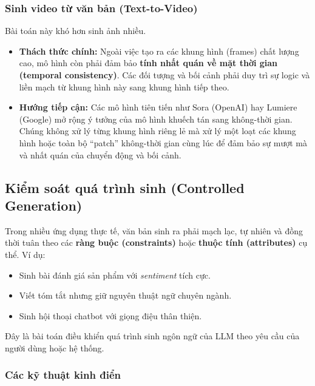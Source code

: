 \subsubsection{Sinh video từ văn bản (Text-to-Video)}
Bài toán này khó hơn sinh ảnh nhiều.
\begin{itemize}
    \item \textbf{Thách thức chính:} Ngoài việc tạo ra các khung hình (frames) chất lượng cao, mô hình còn phải đảm bảo \textbf{tính nhất quán về mặt thời gian (temporal consistency)}. Các đối tượng và bối cảnh phải duy trì sự logic và liền mạch từ khung hình này sang khung hình tiếp theo.
    \item \textbf{Hướng tiếp cận:} Các mô hình tiên tiến như Sora (OpenAI) hay Lumiere (Google) mở rộng ý tưởng của mô hình khuếch tán sang không-thời gian. Chúng không xử lý từng khung hình riêng lẻ mà xử lý một loạt các khung hình hoặc toàn bộ “patch” không-thời gian cùng lúc để đảm bảo sự mượt mà và nhất quán của chuyển động và bối cảnh.
\end{itemize}

\subsection{Kiểm soát quá trình sinh (Controlled Generation)}
\label{ssec:controlled_generation}

Trong nhiều ứng dụng thực tế, văn bản sinh ra phải mạch lạc, tự nhiên và đồng thời tuân theo các \textbf{ràng buộc (constraints)} hoặc \textbf{thuộc tính (attributes)} cụ thể. Ví dụ:
\begin{itemize}
    \item Sinh bài đánh giá sản phẩm với \textit{sentiment} tích cực.
    \item Viết tóm tắt nhưng giữ nguyên thuật ngữ chuyên ngành.
    \item Sinh hội thoại chatbot với giọng điệu thân thiện.
\end{itemize}

Đây là bài toán điều khiển quá trình sinh ngôn ngữ của LLM theo yêu cầu của người dùng hoặc hệ thống.

\subsubsection{Các kỹ thuật kinh điển}
\label{sssec:classic_controlled_generation}

